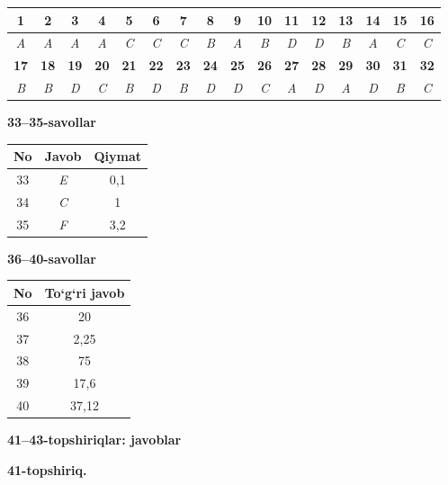 \documentclass[11pt,a4paper]{article}
\begin{document}
\noindent\begin{tabular}{|c|c|c|c|c|c|c|c|c|c|c|c|c|c|c|c|}\hline
\textbf{1} & \textbf{2} & \textbf{3} & \textbf{4} & \textbf{5} & \textbf{6} & \textbf{7} & \textbf{8} & \textbf{9} & \textbf{10} & \textbf{11} & \textbf{12} & \textbf{13} & \textbf{14} & \textbf{15} & \textbf{16}\\\hline
\textsl{A} & \textsl{A} & \textsl{A} & \textsl{A} & \textsl{C} & \textsl{C} & \textsl{C} & \textsl{B} & \textsl{A} & \textsl{B} & \textsl{D} & \textsl{D} & \textsl{B} & \textsl{A} & \textsl{C} & \textsl{C}\\\hline
\textbf{17} & \textbf{18} & \textbf{19} & \textbf{20} & \textbf{21} & \textbf{22} & \textbf{23} & \textbf{24} & \textbf{25} & \textbf{26} & \textbf{27} & \textbf{28} & \textbf{29} & \textbf{30} & \textbf{31} & \textbf{32}\\\hline
\textsl{B} & \textsl{B} & \textsl{D} & \textsl{C} & \textsl{B} & \textsl{D} & \textsl{B} & \textsl{D} & \textsl{D} & \textsl{C} & \textsl{A} & \textsl{D} & \textsl{A} & \textsl{D} & \textsl{B} & \textsl{C}\\\hline
\end{tabular}\par\medskip
\noindent\textbf{33--35-savollar}\par\smallskip
\noindent\begin{tabular}{|c|c|c|}\hline \textbf{No} & \textbf{Javob} & \textbf{Qiymat}\\\hline
33 & \textsl{E} & 0,1\\\hline
34 & \textsl{C} & 1\\\hline
35 & \textsl{F} & 3,2\\\hline
\end{tabular}\par\medskip
\noindent\textbf{36--40-savollar}\par\smallskip
\noindent\begin{tabular}{|c|c|}\hline \textbf{No} & \textbf{To`g`ri javob}\\\hline
36 & 20\\\hline
37 & 2,25\\\hline
38 & 75\\\hline
39 & 17,6\\\hline
40 & 37,12\\\hline
\end{tabular}\par\medskip
\noindent\textbf{41--43-topshiriqlar: javoblar}\par\smallskip
\noindent\textbf{41-topshiriq.}\par
\end{document}
